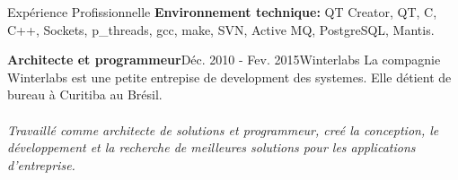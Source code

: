 \documentclass{resume}
\begin{document}
\begin{rSection}{Expérience Profissionnelle}
      {\fontsize{8}{9}\selectfont \textbf{Environnement technique:} QT Creator, QT, C, C++, Sockets, p\_threads, gcc, make, SVN, Active MQ, PostgreSQL, Mantis.}\\

    \begin{rSubsection}{\fontsize{12}{14}\selectfont \bf Architecte et programmeur}{\fontsize{12}{14}\selectfont Déc. 2010 - Fev. 2015}{\fontsize{12}{14}\selectfont Winterlabs}{}
    La compagnie Winterlabs est une petite entrepise de development des systemes. Elle
détient de bureau à Curitiba au Brésil. \\\\
\textit{Travaillé comme architecte de solutions et programmeur, creé la conception, le développement et la recherche de meilleures solutions pour les applications d'entreprise.}
    \end{rSubsection}


\end{rSection}
\end{document}
